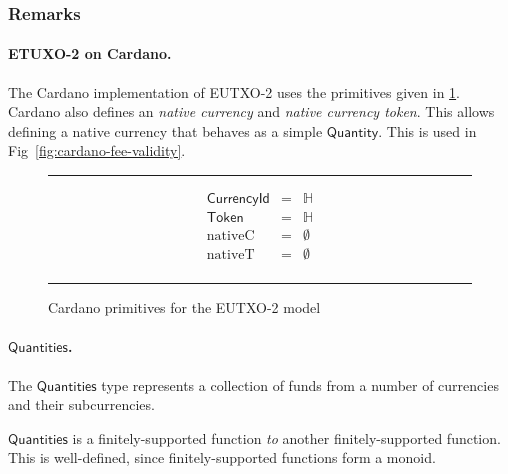 \documentclass[a4paper]{article}
\newcommand{\s}{\textsf}  %
\newcommand\rfskip{7pt}
\newenvironment{ruledfigure}[1]{\begin{figure}[#1]\hrule\vspace{\rfskip}}{\vspace{\rfskip}\hrule\end{figure}}
\newcommand{\qty}{\ensuremath{\s{Quantity}}}
\newcommand{\token}{\ensuremath{\s{Token}}}
\newcommand{\currency}{\ensuremath{\s{CurrencyId}}}
\newcommand{\nativeCur}{\ensuremath{\mathrm{nativeC}}}
\newcommand{\nativeTok}{\ensuremath{\mathrm{nativeT}}}
\newcommand{\qtymap}{\ensuremath{\s{Quantities}}}
\renewcommand\H{\ensuremath{\mathbb{H}}}
\newcommand{\emptyBs}{\ensuremath{\emptyset}}
\begin{document}
\subsubsection{Remarks}
\paragraph{ETUXO-2 on Cardano.}
The Cardano implementation of EUTXO-2 uses the primitives given in
\cref{fig:eutxo-2-types-cardano}.
Cardano also defines an \emph{native currency} and \emph{native currency token}.
This allows defining a native currency that behaves as a simple \qty{}. This
is used in Fig~\ref{fig:cardano-fee-validity}.
\begin{ruledfigure}{H}
  \begin{displaymath}
    \begin{array}{rll}
      \currency  &=& \H\\
      \token     &=& \H\\
      \nativeCur &=& \emptyBs\\
      \nativeTok &=& \emptyBs\\
    \end{array}
  \end{displaymath}
  \caption{Cardano primitives for the EUTXO-2 model}
  \label{fig:eutxo-2-types-cardano}
\end{ruledfigure}

\paragraph{\qtymap{}. }
The \qtymap{} type represents a collection of funds from a
number of currencies and their subcurrencies.

\qtymap{} is a finitely-supported function \emph{to} another finitely-supported
function. This is well-defined, since finitely-supported functions form a monoid.
\end{document}
